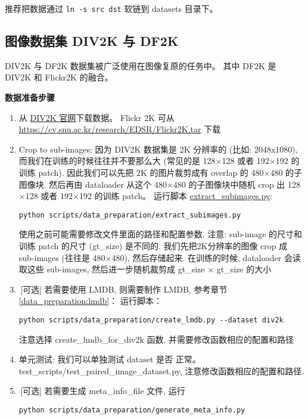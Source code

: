 \documentclass[../main.tex]{subfiles}
\begin{document}
推荐把数据通过 \texttt{ln -s src dst} 软链到 datasets 目录下。

\subsection{图像数据集 DIV2K 与 DF2K}

DIV2K 与 DF2K 数据集被广泛使用在图像复原的任务中。
其中 DF2K 是 DIV2K 和 Flickr2K 的融合。

\noindent\textbf{数据准备步骤}
\begin{enumerate}
    \item 从 \href{https://data.vision.ee.ethz.ch/cvl/DIV2K}{DIV2K 官网}下载数据。 Flickr 2K 可从 \url{https://cv.snu.ac.kr/research/EDSR/Flickr2K.tar} 下载
    \item Crop to sub-images: 因为 DIV2K 数据集是 2K 分辨率的 (比如: 2048x1080), 而我们在训练的时候往往并不要那么大 (常见的是 128$\times$128 或者 192$\times$192 的训练 patch). 因此我们可以先把 2K 的图片裁剪成有 overlap 的 480$\times$480 的子图像块. 然后再由 dataloader 从这个 480$\times$480 的子图像块中随机 crop 出 128$\times$128 或者 192$\times$192 的训练 patch。
          运行脚本 \href{https://github.com/XPixelGroup/BasicSR/blob/master/scripts/data_preparation/extract_subimages.py}{extract\_subimages.py}:
          \begin{verbatim}
python scripts/data_preparation/extract_subimages.py
\end{verbatim}
          使用之前可能需要修改文件里面的路径和配置参数. 注意: sub-image 的尺寸和训练 patch 的尺寸 (gt\_size) 是不同的. 我们先把2K分辨率的图像 crop 成 sub-images (往往是 480$\times$480), 然后存储起来. 在训练的时候, dataloader 会读取这些 sub-images, 然后进一步随机裁剪成 gt\_size $\times$ gt\_size 的大小
    \item\,[可选] 若需要使用 LMDB, 则需要制作 LMDB, 参考章节\ref{data_preparation:lmdb}：
          运行脚本：
          \begin{verbatim}
python scripts/data_preparation/create_lmdb.py --dataset div2k
\end{verbatim}
          注意选择 create\_lmdb\_for\_div2k 函数, 并需要修改函数相应的配置和路径
    \item 单元测试: 我们可以单独测试 dataset 是否 正常。test\_scripts/test\_paired\_image\_dataset.py, 注意修改函数相应的配置和路径.
    \item\,[可选] 若需要生成 meta\_info\_file 文件,
          运行
          \begin{verbatim}
python scripts/data_preparation/generate_meta_info.py
\end{verbatim}
\end{enumerate}
\end{document}
